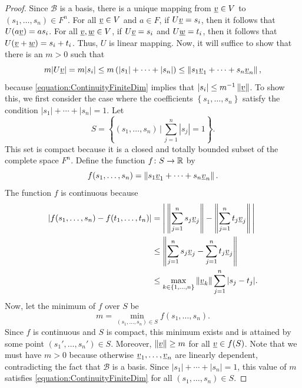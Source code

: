 \begin{proof}
Since $\mathcal{B}$ is a basis, there is a unique mapping from $\underline{v}\in V$ to $(s_1,\ldots,s_n)\in F^n$.
For all $\underline{v}\in V$ and $a\in F$, if $U \underline{v} = s_i$, then it follows that $U (a \underline{v}) = a s_i$.
For all $\underline{v},\underline{w}\in V$, if $U \underline{v} = s_i$ and $U \underline{w} = t_i$, then it follows that $U(\underline{v} + \underline{w}) = s_i + t_i$.
Thus, $U$ is linear mapping.
Now, it will suffice to show that there is an $m > 0$ such that
\begin{equation} \label{equation:ContinuityFiniteDim}
m |U \underline{v}| = m|s_i| \leq m \left( |s_1| + \cdots + |s_n| \right) \leq \left\| s_1 \underline{v}_1 + \cdots + s_n \underline{v}_n \right\| ,
\end{equation}
because \eqref{equation:ContinuityFiniteDim} implies that $|s_i| \leq m^{-1} \left\| \underline{v} \right\|$.
To show this, we first consider the case where the coefficients $\left\{ s_1, \ldots, s_n \right\}$ satisfy the condition $|s_1| + \cdots + |s_n| = 1$.
Let
\begin{equation*}
S = \left\{ (s_1, \ldots, s_n) \,\Big| \, \sum_{j=1}^n |s_j| = 1 \right\}.
\end{equation*}
This set is compact because it is a closed and totally bounded subset of the complete space $F^n$.
Define the function $f \colon S \rightarrow \mathbb{R}$ by
\begin{equation*}
f(s_1, \ldots, s_n) = \left\| s_1 \underline{v}_1 + \cdots + s_n \underline{v}_n \right\| .
\end{equation*}
The function $f$ is continuous because \begin{align*}
|f(s_1, \ldots, s_n)-f(t_1, \ldots, t_n)|
&= \left| \, \left\| \sum_{j=1}^n s_j \underline{v}_j \right\| - \left\| \sum_{j=1}^n t_j \underline{v}_j \right\| \, \right|  \\
& \leq \left\| \sum_{j=1}^n s_j \underline{v}_j - \sum_{j=1}^n t_j \underline{v}_j \right\| \\
&\leq \max_{k\in\{1,\ldots,n\}} \|\underline{v}_k\| \sum_{j=1}^n |s_j - t_j|.
\end{align*}
Now, let the minimum of $f$ over $S$ be
\begin{equation*}
m = \min_{(s_1, \ldots, s_n) \in S} f(s_1, \ldots, s_n).
\end{equation*}
Since $f$ is continuous and $S$ is compact, this minimum exists and is attained by some point $(s_1', \ldots, s_n') \in S$.
Moreover, $\| \underline{v} \| \geq m$ for all $\underline{v} \in f(S)$.
Note that we must have $m > 0$ because otherwise $\underline{v}_1, \ldots, \underline{v}_n$ are linearly dependent, contradicting the fact that $\mathcal{B}$ is a basis.
Since $|s_1|+\cdots+|s_n|=1$, this value of $m$ satisfies \eqref{equation:ContinuityFiniteDim} for all $(s_1,\ldots,s_n) \in S$.


\end{proof}
